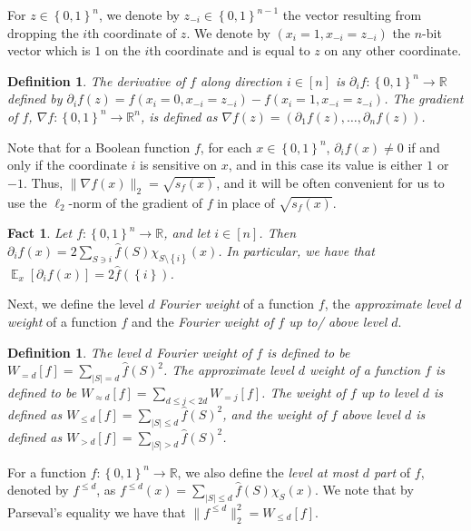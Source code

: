 \documentclass[10pt]{article}
\newcommand{\card}[1]{\left\lvert #1\right\rvert}
\newcommand{\set}[1]{{\left\{#1\right\}}}
\newcommand{\Expect}[2]{{\mathop{\mathbb E}_{#1}\left[#2\right]}}
\newcommand{\norm}[1]{\lVert #1\rVert}
\newcommand{\power}[1]{\set{0,1}^{#1}}
\newtheorem{definition}[thm]{Definition}
\newtheorem{fact}[thm]{Fact}
\begin{document}
For $z\in\power{n}$, we denote by $z_{-i}\in\power{n-1}$ the vector resulting from dropping
the $i$th coordinate of $z$. We denote by $(x_i = 1, x_{-i} = z_{-i})$ the $n$-bit vector
which is $1$ on the $i$th coordinate and is equal to $z$ on any other coordinate.
\begin{definition}
  The derivative of $f$ along direction $i\in[n]$
  is $\partial_i f\colon\power{n}\to\mathbb{R}$ defined by
  $\partial_i f(z) = f(x_i = 0, x_{-i} = z_{-i}) - f(x_i = 1, x_{-i} = z_{-i})$.
  The gradient of $f$, $\nabla f\colon\power{n}\to\mathbb{R}^n$, is defined
  as $\nabla f(z) = (\partial_1 f(z),\ldots,\partial_n f(z))$.
\end{definition}
Note that for a Boolean function $f$, for each $x\in\power{n}$, $\partial_i f(x) \neq 0$ if and only if the coordinate $i$
is sensitive on $x$, and in this case its value is either $1$ or $-1$. Thus, $\norm{\nabla f(x)}_2 = \sqrt{s_f(x)}$,
and it will be often convenient for us to use the $\ell_2$-norm of the gradient of $f$ in place of $\sqrt{s_f(x)}$.

\begin{fact}\label{fact:singeton}
  Let $f\colon\power{n}\to\mathbb{R}$, and let $i\in[n]$.
  Then $\partial_i f(x) =
  2\sum\limits_{S\ni i}{\widehat{f}(S)\chi_{S\setminus \set{i}}(x)}$.
  In particular, we have that $\Expect{x}{\partial_i f(x)} = 2\widehat{f}(\set{i})$.
\end{fact}


Next, we define the level $d$ \emph{Fourier weight} of a function $f$, the \emph{approximate level $d$ weight} of a function $f$
and the \emph{Fourier weight of $f$ up to/ above level $d$}.
\begin{definition}
  The level $d$ Fourier weight of $f$ is defined to be $W_{=d}[f] = \sum\limits_{\card{S} = d}{\widehat{f}(S)^2}$. The
  approximate level $d$ weight of a function $f$ is defined to be $W_{\approx d}[f] = \sum\limits_{d\leq j<2d}{W_{=j}[f]}$.
  The weight of $f$ up to level $d$ is defined as $W_{\leq d}[f] = \sum\limits_{\card{S}\leq d}{\widehat{f}(S)^2}$,
  and the weight of $f$ above level $d$ is defined as $W_{> d}[f] = \sum\limits_{\card{S}> d}{\widehat{f}(S)^2}$.
\end{definition}
For a function $f\colon\power{n}\to\mathbb{R}$, we also define the \emph{level at most $d$ part} of $f$, denoted by $f^{\leq d}$,
as $f^{\leq d}(x) = \sum\limits_{\card{S}\leq d} \widehat{f}(S)\chi_S(x)$. We note that by Parseval's equality we have that
$\norm{f^{\leq d}}_2^2 = W_{\leq d}[f]$.
\end{document}
